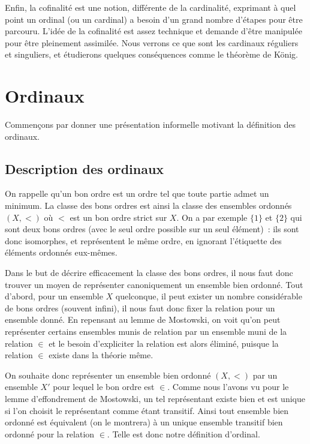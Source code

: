 Enfin, la cofinalité est une notion, différente de la cardinalité, exprimant à
quel point un ordinal (ou un cardinal) a besoin d'un grand nombre d'étapes pour
être parcouru. L'idée de la cofinalité est assez technique et demande d'être
manipulée pour être pleinement assimilée. Nous verrons ce que sont les cardinaux
réguliers et singuliers, et étudierons quelques conséquences comme le théorème
de König.

\section{Ordinaux}

\noindent
Commençons par donner une présentation informelle motivant la définition des
ordinaux.

\subsection{Description des ordinaux}

On rappelle qu'un bon ordre est un ordre tel que toute partie admet un minimum.
La classe des bons ordres est ainsi la classe des ensembles ordonnés $(X,<)$
où $<$ est un bon ordre strict sur $X$. On a par exemple $\{1\}$ et $\{2\}$ qui
sont deux bons ordres (avec le seul ordre possible sur un seul élément)~: ils
sont donc isomorphes, et représentent le même ordre, en ignorant l'étiquette des
éléments ordonnés eux-mêmes.

Dans le but de décrire efficacement la classe des bons ordres, il nous faut donc
trouver un moyen de représenter canoniquement un ensemble bien ordonné. Tout
d'abord, pour un ensemble $X$ quelconque, il peut exister un nombre considérable
de bons ordres (souvent infini), il nous faut donc fixer la relation pour un
ensemble donné. En repensant au lemme de Mostowski, on voit qu'on peut
représenter certains ensembles munis de relation par un ensemble muni de la
relation $\in$ et le besoin d'expliciter la relation est alors éliminé, puisque
la relation $\in$ existe dans la théorie même.

On souhaite donc représenter un ensemble bien ordonné $(X,<)$ par un ensemble
$X'$ pour lequel le bon ordre est $\in$. Comme nous l'avons vu pour le lemme
d'effondrement de Mostowski, un tel représentant existe bien et est unique si
l'on choisit le représentant comme étant transitif. Ainsi tout ensemble bien
ordonné est équivalent (on le montrera) à un unique ensemble transitif bien
ordonné pour la relation $\in$. Telle est donc notre définition d'ordinal.

